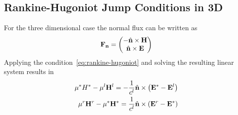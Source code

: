 \subsection{Rankine-Hugoniot Jump Conditions in 3D}
For the three dimensional case the normal flux can be written as
\begin{align*}
\mathbf{\mathbf{F}_n} =
\begin{pmatrix}
- \hat{\mathbf{n}} \times \mathbf{H} \\
\hat{\mathbf{n}} \times \mathbf{E}
\end{pmatrix}
\end{align*}
Applying the condition~\eqref{eq:rankine-hugoniot} and solving the resulting linear system results in
\begin{align}
  \mu^* H^* - \mu^l \mathbf{H}^l = - \frac{1}{c^l} \hat{\mathbf{n}} \times \left( \mathbf{E}^* - \mathbf{E}^l \right)
  \label{eq:jump-condition-resulting-equation-system-3D-1} \\
  \mu^r \mathbf{H}^r - \mu^* \mathbf{H}^* = \frac{1}{c^l} \hat{\mathbf{n}} \times \left( \mathbf{E}^r - \mathbf{E}^* \right)
  \label{eq:jump-condition-resulting-equation-system-3D-2} \\
\end{align}
